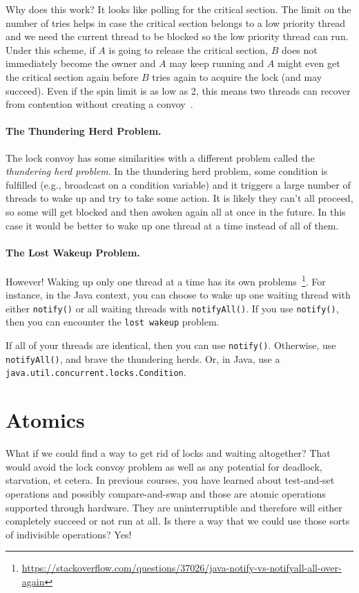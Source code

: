 Why does this work? It looks like polling for the critical section. The limit on the number of tries helps in case the critical section belongs to a low priority thread and we need the current thread to be blocked so the low priority thread can run. Under this scheme, if $A$ is going to release the critical section, $B$ does not immediately become the owner and $A$ may keep running and $A$ might even get the critical section again before $B$ tries again to acquire the lock (and may succeed). Even if the spin limit is as low as 2, this means two threads can recover from contention without creating a convoy~\cite{lockconvoys}. 

\paragraph{The Thundering Herd Problem.} The lock convoy has some similarities with a different problem called the \textit{thundering herd problem}. In the thundering herd problem, some condition is fulfilled (e.g., broadcast on a condition variable) and it triggers a large number of threads to wake up and try to take some action. It is likely they can't all proceed, so some will get blocked and then awoken again all at once in the future. In this case it would be better to wake up one thread at a time instead of all of them.

\paragraph{The Lost Wakeup Problem.} However! Waking up only one thread at a time has its own problems~\footnote{\url{https://stackoverflow.com/questions/37026/java-notify-vs-notifyall-all-over-again}}. For instance, in the Java context, you can choose to wake up one waiting thread with either \texttt{notify()} or all waiting threads with \texttt{notifyAll()}. If you use \texttt{notify()}, then you can encounter the \texttt{lost wakeup} problem.

If all of your threads are identical, then you can use \texttt{notify()}. Otherwise, use \texttt{notifyAll()}, and brave the thundering herds. Or, in Java, use a \texttt{java.util.concurrent.locks.Condition}.

\section*{Atomics}
What if we could find a way to get rid of locks and waiting altogether? That would avoid the lock convoy problem as well as any potential for deadlock, starvation, et cetera. In previous courses, you have learned about test-and-set operations and possibly compare-and-swap and those are atomic operations supported through hardware. They are uninterruptible and therefore will either completely succeed or not run at all. Is there a way that we could use those sorts of indivisible operations? Yes!

